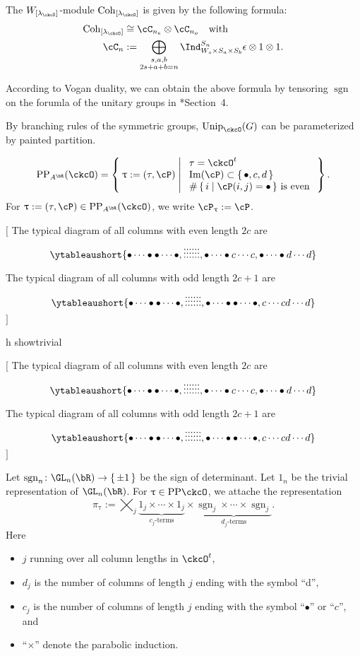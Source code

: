 \documentclass[12pt,a4paper]{amsart}
\let\ytb=\ytableaushort
\newcommand{\trivial}[2][]{\if\relax\detokenize{#1}\relax
  {%
      \color{orange} \vspace{0em} $[$  #2 $]$
      \color{black}
  }
  \else
\ifx#1h
\ifcsname showtrivial\endcsname
{%
    \color{orange} \vspace{0em}  $[$ #2 $]$
    \color{black}
}
\fi
\else {\red Wrong argument!} \fi
\fi
}
\def\Im{\operatorname{Im}}
\newcommand{\sgn}{\operatorname{sgn}}
\numberwithin{equation}{section}
\theoremstyle{remark}
\def\Unip{\mathrm{Unip}}
\def\lamck{\lambda_\ckcO}
\def\Wint#1{W_{[#1]}}
\def\Cint#1{\Coh_{[#1]}}
\def\PP{\mathrm{PP}}
\def\Im{\mathrm{Im}}
\def\Coh{\mathrm{Coh}}
\begin{document}
The $\Wint{\lamck}$-module $\Cint{\lamck}$ is given by the following formula:
\[
  \begin{split}
  \Cint{\lamck} &\cong \cC_{n_e}\otimes \cC_{n_o} \quad \text{with} \\ 
 \cC_n &:= \bigoplus_{\substack{s,a,b\\2s+a+b=n}} 
 \Ind_{W_s\times S_a\times S_b}^{S_{n}} \epsilon \otimes 1\otimes 1. %
  \end{split}
\] 

According to Vogan duality,  we can obtain the above formula by tensoring $\sgn$
on the forumla of the unitary groups in \cite{BV.W}*{Section~4}.

By branching rules of the symmetric groups,  $\Unip_{\ckcO}(G)$ can be parameterized by painted partition. 

\begin{equation}\label{eq:PP.AR}
\PP_{A^{\bR}}(\ckcO) = \Set{\uptau:=(\tau, \cP)|
  \begin{array}{l}
    \text{$\tau = \ckcO^{t}$}\\
    \text{$\Im(\cP)\subset \set{\bullet,c,d}$}\\
    \text{$\#\set{i|\cP(i,j)=\bullet}$ is even}
  \end{array}
}.
\end{equation}
For $\uptau:=(\tau,\cP)\in \PP_{A^{\bR}}(\ckcO)$, we write $\cP_{\uptau}:= \cP$.

\trivial{
The typical diagram of all columns with even length $2c$ are
\[
\ytb{\bullet\cdots\bullet\bullet\cdots\bullet,\vdots\vdots\vdots\vdots\vdots\vdots,
\bullet\cdots\bullet c\cdots c,
\bullet\cdots\bullet d\cdots d
}  
\]

The typical diagram of all columns with odd length $2c+1$ are
\[
\ytb{\bullet\cdots\bullet\bullet\cdots\bullet,\vdots\vdots\vdots\vdots\vdots\vdots,
\bullet\cdots\bullet \bullet\cdots\bullet ,
c\cdots c d\cdots d
}  
\]
}

Let $\sgn_n\colon \GL_n(\bR)\rightarrow \set{\pm 1}$ be the sign of determinant. 
Let $1_n$ be the trivial representation of $\GL_n(\bR)$. 
For $\uptau\in \PP{\ckcO}$, we attache the representation 
\begin{equation}\label{eq:u.GLR}
\pi_\uptau := 
\bigtimes_{j} \underbrace{1_j \times \cdots \times 1_j}_{c_j\text{-terms}}\times
\underbrace{\sgn_j \times \cdots \times {\sgn_j} }_{d_j\text{-terms}}.
\end{equation}
Here 
\begin{itemize}
  \item 
$j$ running over all column lengths in $\ckcO^t$, 
\item $d_j$ is the number of
columns of length $j$ ending with the symbol ``d'',
\item  $c_j$ is the number of
columns of length $j$ ending with the symbol ``$\bullet$'' or ``$c$'', and 
\item  ``$\times$'' denote the parabolic induction.  
\end{itemize}
\end{document}
